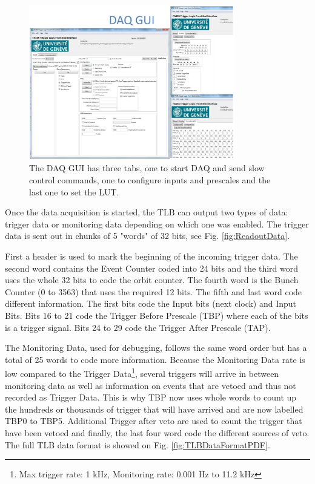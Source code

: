 \begin{figure}[htbp!] 
\centering    
\includegraphics[width=0.8\textwidth]{ChapterDAQ/Figs/GeneralDAQ/DAQGui.jpg}
\caption[DAQ GUI]{The DAQ GUI has three tabs, one to start DAQ and send slow control commands, one to configure inputs and prescales and the last one to set the LUT.}
\label{fig:DAQGui}
\end{figure}

Once the data acquisition is started, the TLB can output two types of data: trigger data or monitoring data depending on which one was enabled. The trigger data is sent out in chunks  of 5 "words" of 32 bits, see Fig. \ref{fig:ReadoutData}.

First a header is used to mark the beginning of the incoming trigger data. The second word contains the Event Counter coded into 24 bits and the third word uses the whole 32 bits to code the orbit counter. The fourth word is the Bunch Counter (0 to 3563) that uses the required 12 bits. The fifth and last word code different information. The first bits code the Input bits (next clock) and Input Bits. Bits 16 to 21 code the Trigger Before Prescale (TBP) where each of the bits is a trigger signal. Bits 24 to 29 code the Trigger After Prescale (TAP).

The Monitoring Data, used for debugging, follows the same word order but has a total of 25 words to code more information. Because the Monitoring Data rate is low compared to the Trigger Data\footnote{Max trigger rate: 1 kHz, Monitoring rate: 0.001 Hz to 11.2 kHz}, several triggers will arrive in between monitoring data as well as information on events that are vetoed and thus not recorded as Trigger Data. This is why TBP now uses whole words to count up the hundreds or thousands of trigger that will have arrived and are now labelled TBP0 to TBP5. Additional Trigger after veto are used to count the trigger that have been vetoed and finally, the last four word code the different sources of veto. The full TLB data format is showed on Fig. \ref{fig:TLBDataFormatPDF}.


